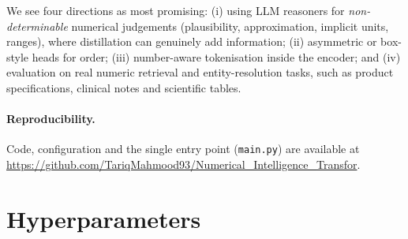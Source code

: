\documentclass[11pt]{article}
\begin{document}
We see four directions as most promising: (i) using LLM reasoners for \emph{non-determinable} numerical judgements
(plausibility, approximation, implicit units, ranges), where distillation can genuinely add information; (ii)
asymmetric or box-style heads for order; (iii) number-aware tokenisation inside the encoder; and (iv) evaluation on
real numeric retrieval and entity-resolution tasks, such as product specifications, clinical notes and scientific
tables.

\paragraph{Reproducibility.} Code, configuration and the single entry point (\texttt{main.py}) are available at
\url{https://github.com/TariqMahmood93/Numerical_Intelligence_Transfor}.




\appendix
\section{Hyperparameters}
\begin{table}[h]
\centering\small
{}
\end{table}
\end{document}
